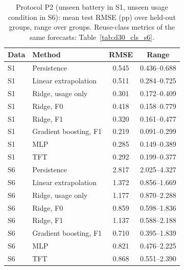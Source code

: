 \begin{table}[t]
  \centering
  \caption{Protocol P2 (unseen battery in S1, unseen usage condition in S6): mean test RMSE (pp) over held-out groups, range over groups. Reuse-class metrics of the same forecasts: Table~\ref{tab:d30_cls_s6}.}
  \label{tab:p2}
  \setlength{\tabcolsep}{3pt}
  \begin{tabular}{llcc}
    \toprule
    Data & Method & RMSE & Range \\
    \midrule
    S1 & Persistence & 0.545 & 0.436--0.688 \\
    S1 & Linear extrapolation & 0.511 & 0.284--0.725 \\
    S1 & Ridge, usage only & 0.301 & 0.172--0.409 \\
    S1 & Ridge, F0 & 0.418 & 0.158--0.779 \\
    S1 & Ridge, F1 & 0.320 & 0.161--0.477 \\
    S1 & Gradient boosting, F1 & 0.219 & 0.091--0.299 \\
    S1 & MLP & 0.285 & 0.149--0.389 \\
    S1 & TFT & 0.292 & 0.199--0.377 \\
    \midrule
    S6 & Persistence & 2.817 & 2.025--4.327 \\
    S6 & Linear extrapolation & 1.372 & 0.856--1.669 \\
    S6 & Ridge, usage only & 1.177 & 0.870--2.288 \\
    S6 & Ridge, F0 & 0.859 & 0.598--1.836 \\
    S6 & Ridge, F1 & 1.137 & 0.588--2.188 \\
    S6 & Gradient boosting, F1 & 0.710 & 0.395--1.839 \\
    S6 & MLP & 0.821 & 0.476--2.225 \\
    S6 & TFT & 0.868 & 0.551--2.390 \\
    \bottomrule
  \end{tabular}
\end{table}
